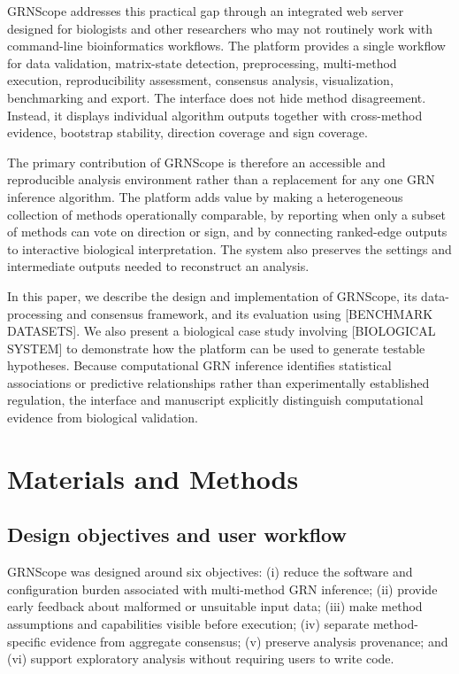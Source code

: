 \documentclass[unnumsec,webpdf,modern,large]{oup-authoring-template}%
\begin{document}
GRNScope addresses this practical gap through an integrated web server designed for biologists and other researchers who may not routinely work with command-line bioinformatics workflows. The platform provides a single workflow for data validation, matrix-state detection, preprocessing, multi-method execution, reproducibility assessment, consensus analysis, visualization, benchmarking and export. The interface does not hide method disagreement. Instead, it displays individual algorithm outputs together with cross-method evidence, bootstrap stability, direction coverage and sign coverage.

The primary contribution of GRNScope is therefore an accessible and reproducible analysis environment rather than a replacement for any one GRN inference algorithm. The platform adds value by making a heterogeneous collection of methods operationally comparable, by reporting when only a subset of methods can vote on direction or sign, and by connecting ranked-edge outputs to interactive biological interpretation. The system also preserves the settings and intermediate outputs needed to reconstruct an analysis.

In this paper, we describe the design and implementation of GRNScope, its data-processing and consensus framework, and its evaluation using [BENCHMARK DATASETS]. We also present a biological case study involving [BIOLOGICAL SYSTEM] to demonstrate how the platform can be used to generate testable hypotheses. Because computational GRN inference identifies statistical associations or predictive relationships rather than experimentally established regulation, the interface and manuscript explicitly distinguish computational evidence from biological validation.

\section{Materials and Methods}

\subsection{Design objectives and user workflow}

GRNScope was designed around six objectives: (i) reduce the software and configuration burden associated with multi-method GRN inference; (ii) provide early feedback about malformed or unsuitable input data; (iii) make method assumptions and capabilities visible before execution; (iv) separate method-specific evidence from aggregate consensus; (v) preserve analysis provenance; and (vi) support exploratory analysis without requiring users to write code.
\end{document}
